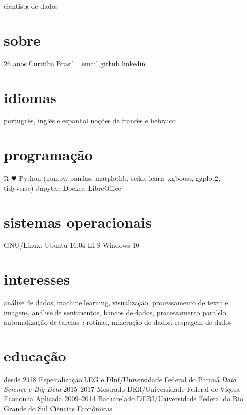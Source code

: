 \documentclass[]{friggeri-cv}
\begin{document}
       {cientista de dados}


\begin{aside}
  \section{sobre}
    26 anos
    Curitiba
    Brasil
    ~
    \href{mailto:jt\_anchante@hotmail.com}{email}
    \href{https://github.com/jayme-anchante/}{github}
    \href{https://www.linkedin.com/in/jayme-anchante}{linkedin}
  \section{idiomas}
    português, inglês e espanhol
    noções de francês e hebraico
  \section{programação}
    R {\color{red} $\varheartsuit$} Python
    (numpy, pandas, matplotlib,
    scikit-learn, xgboost,
    ggplot2, tidyverse)
    Jupyter, Docker, LibreOffice
  \section{sistemas operacionais}
    GNU/Linux: Ubuntu 16.04 LTS
    Windows 10
\end{aside}

\section{interesses}

análise de dados, machine learning, visualização, processamento de texto
e imagens, análise de sentimentos, bancos de dados, processamento paralelo,
automatização de tarefas e rotinas, mineração de dados, respagem de dados

\section{educação}

\begin{entrylist}
  \entry
    {desde 2018}
    {Especialização}
    {LEG e DInf/Universidade Federal do Paraná}
    {\emph{Data Science e Big Data}}
  \entry
    {2015–2017}
    {Mestrado}
    {DER/Universidade Federal de Viçosa}
    {Economia Aplicada}
  \entry
    {2009–2014}
    {Bacharelado}
    {DERI/Universidade Federal do Rio Grande do Sul}
    {Ciências Econômicas}
\end{entrylist}
\end{document}
